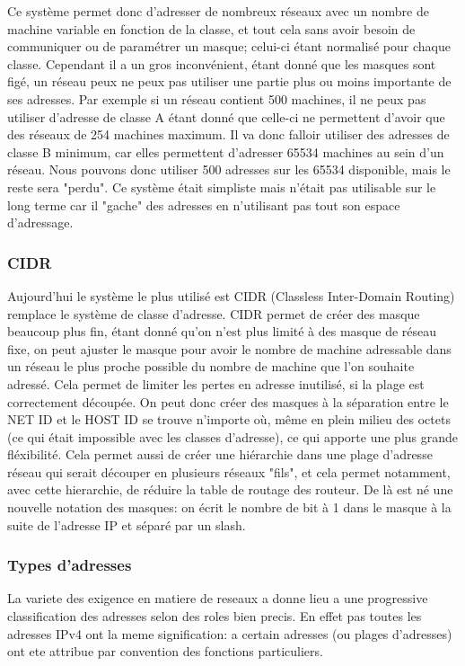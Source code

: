 Ce système permet donc d'adresser de nombreux réseaux avec un nombre de machine
variable en fonction de la classe, et tout cela sans avoir besoin de
communiquer ou de paramétrer un masque; celui-ci étant normalisé pour chaque
classe.  Cependant il a un gros inconvénient, étant donné que les masques sont
figé, un réseau peux ne peux pas utiliser une partie plus ou moins importante
de ses adresses. Par exemple si un réseau contient 500 machines, il ne peux pas
utiliser d'adresse de classe A étant donné que celle-ci ne permettent d'avoir
que des réseaux de 254 machines maximum. Il va donc falloir utiliser des
adresses de classe B minimum, car elles permettent d'adresser 65534 machines au
sein d'un réseau. Nous pouvons donc utiliser 500 adresses sur les 65534
disponible, mais le reste sera "perdu".  Ce système était simpliste mais
n'était pas utilisable sur le long terme car il "gache" des adresses en
n'utilisant pas tout son espace d'adressage.


\subsubsection{CIDR}

Aujourd'hui le système le plus utilisé est CIDR (Classless Inter-Domain
Routing) remplace le système de classe d'adresse. CIDR permet de créer des
masque beaucoup plus fin, étant donné qu'on n'est plus limité à des masque de
réseau fixe, on peut ajuster le masque pour avoir le nombre de machine
adressable dans un réseau le plus proche possible du nombre de machine que l'on
souhaite adressé.  Cela permet de limiter les pertes en adresse inutilisé, si
la plage est correctement découpée.  On peut donc créer des masques à la
séparation entre le NET ID et le HOST ID se trouve n'importe où, même en plein
milieu des octets (ce qui était impossible avec les classes d'adresse), ce qui
apporte une plus grande fléxibilité.  Cela permet aussi de créer une hiérarchie
dans une plage d'adresse réseau qui serait découper en plusieurs réseaux
"fils", et cela permet notamment, avec cette hierarchie, de réduire la table de
routage des routeur.  De là est né une nouvelle notation des masques: on écrit
le nombre de bit à 1 dans le masque à la suite de l'adresse IP et séparé par un
slash.







\subsubsection{Types d'adresses}
La variete des exigence en matiere de reseaux a donne lieu a une progressive
classification des adresses selon des roles bien precis.  En effet pas toutes
les adresses IPv4 ont la meme signification: a certain adresses (ou plages
d'adresses) ont ete attribue par convention des fonctions particuliers.

